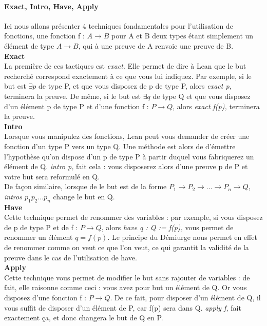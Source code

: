 \paragraph{Exact, Intro, Have, Apply}
Ici nous allons présenter 4 techniques fondamentales pour l'utilisation de fonctions, une fonction f : $A\to B$ pour A et B deux types étant simplement un élément de type $A\to B$, qui à une preuve de A renvoie une preuve de B.\\
\textbf{Exact}\\
La première de ces tactiques est \textit{exact}. Elle permet de dire à Lean que le but recherché correspond exactement à ce que vous lui indiquez. Par exemple, si le but est  $\exists  p$ de type P, et que vous disposez de p de type P, alors \textit{exact p,} terminera la preuve. De même, si le but est  $\exists  q$ de type Q et que vous disposez d'un élément p de type P et d'une fonction f : $P \to Q$, alors \textit{exact f(p),} terminera la preuve.\\
\textbf{Intro} \\
Lorsque vous manipulez des fonctions, Lean peut vous demander de créer une fonction d'un type P vers un type Q. Une méthode est alors de d'émettre l'hypothèse qu'on dispose d'un p de type P à partir duquel vous fabriquerez un élément de Q. \textit{intro p,} fait cela : vous disposerez alors d'une preuve p de P et votre but sera reformulé en Q. \\
De façon similaire, lorsque de le but est de la forme $P_1 \to P_2 \to ... \to P_n \to Q$, \textit{intros $p_1 p_2 ... p_n$} change le but en Q.\\
\textbf{Have} \\
Cette technique permet de renommer des variables : par exemple, si vous disposez de p de type P et de f : $P \to Q$, alors \textit{have q : Q := f(p),} vous permet de renommer un élément $q = f(p)$. Le principe du Démiurge nous permet en effet de renommer comme on veut ce que l'on veut, ce qui garantit la validité de la preuve dans le cas de l'utilisation de have. \\
\textbf{Apply}\\
Cette technique vous permet de modifier le but sans rajouter de variables : de fait, elle raisonne comme ceci : vous avez pour but un élément de Q. Or vous disposez d'une fonction f : $P \to Q$. De ce fait, pour disposer d'un élément de Q, il vous suffit de disposer d'un élément de P, car f(p) sera dans Q. \textit{apply f,} fait exactement ça, et donc changera le but de Q en P.\\

